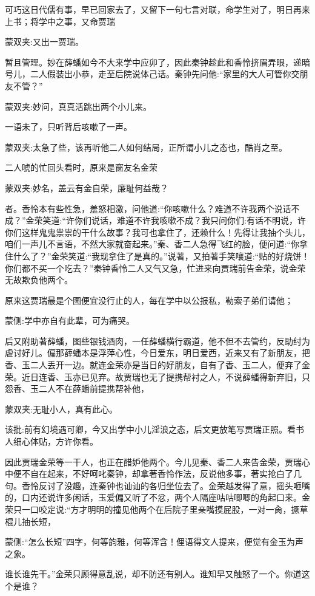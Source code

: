 \begin{parag}
    可巧这日代儒有事，早已回家去了，又留下一句七言对联，命学生对了，明日再来上书；将学中之事，又命贾瑞\begin{note}蒙双夹:又出一贾瑞。\end{note}暂且管理。妙在薛蟠如今不大来学中应卯了，因此秦钟趁此和香怜挤眉弄眼，递暗号儿，二人假装出小恭，走至后院说体己话。秦钟先问他:“家里的大人可管你交朋友不管？”\begin{note}蒙双夹:妙问，真真活跳出两个小儿来。\end{note}一语未了，只听背后咳嗽了一声。\begin{note}蒙双夹:太急了些，该再听他二人如何结局，正所谓小儿之态也，酷肖之至。\end{note}二人唬的忙回头看时，原来是窗友名金荣\begin{note}蒙双夹:妙名，盖云有金自荣，廉耻何益哉？\end{note}者。香怜本有些性急，羞怒相激，问他道:“你咳嗽什么？难道不许我两个说话不成？”金荣笑道:“许你们说话，难道不许我咳嗽不成？我只问你们:有话不明说，许你们这样鬼鬼祟祟的干什么故事？我可也拿住了，还赖什么！先得让我抽个头儿，咱们一声儿不言语，不然大家就奋起来。”秦、香二人急得飞红的脸，便问道:“你拿住什么了？”金荣笑道:“我现拿住了是真的。”说著，又拍著手笑嚷道:“贴的好烧饼！你们都不买一个吃去？”秦钟香怜二人又气又急，忙进来向贾瑞前告金荣，说金荣无故欺负他两个。
\end{parag}


\begin{parag}
    原来这贾瑞最是个图便宜没行止的人，每在学中以公报私，勒索子弟们请他；\begin{note}蒙侧:学中亦自有此辈，可为痛哭。\end{note}后又附助著薛蟠，图些银钱酒肉，一任薛蟠横行霸道，他不但不去管约，反助纣为虐讨好儿。偏那薛蟠本是浮萍心性，今日爱东，明日爱西，近来又有了新朋友，把香、玉二人丢开一边。就连金荣亦是当日的好朋友，自有了香、玉二人，便弃了金荣。近日连香、玉亦已见弃。故贾瑞也无了提携帮衬之人，不说薛蟠得新弃旧，只怨香、玉二人不在薛蟠前提携帮补他，\begin{note}蒙双夹:无耻小人，真有此心。\end{note}\begin{note}该批:前有幻境遇可卿，今又出学中小儿淫浪之态，后文更放笔写贾瑞正照。看书人细心体贴，方许你看。\end{note}因此贾瑞金荣等一干人，也正在醋妒他两个。今儿见秦、香二人来告金荣，贾瑞心中便不自在起来，不好呵叱秦钟，却拿著香怜作法，反说他多事，著实抢白了几句。香怜反讨了没趣，连秦钟也讪讪的各归坐位去了。金荣越发得了意，摇头咂嘴的，口内还说许多闲话，玉爱偏又听了不忿，两个人隔座咕咕唧唧的角起口来。金荣只一口咬定说:“方才明明的撞见他两个在后院子里亲嘴摸屁股，一对一肏，撅草棍儿抽长短，\begin{note}蒙侧:“怎么长短”四字，何等韵雅，何等浑含！俚语得文人提来，便觉有金玉为声之象。\end{note}谁长谁先干。”金荣只顾得意乱说，却不防还有别人。谁知早又触怒了一个。你道这个是谁？
\end{parag}



